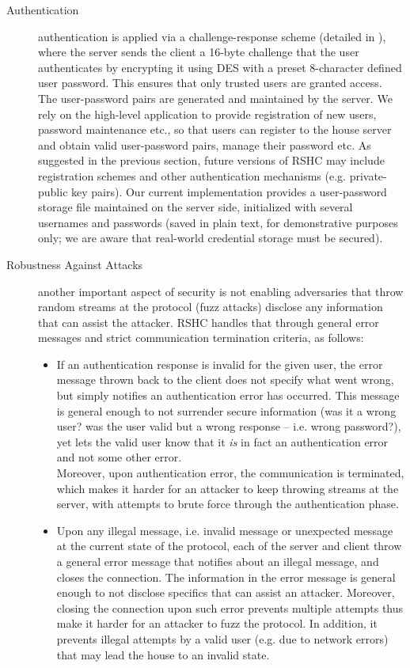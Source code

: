 \begin{description}
\item[Authentication] authentication is applied via a challenge-response scheme (detailed in ), where the server sends the client a 16-byte challenge that the user authenticates by encrypting it using DES with a preset 8-character defined user password. This ensures that only trusted users are granted access.\\
    The user-password pairs are generated and maintained by the server. We rely on the high-level application to provide registration of new users, password maintenance etc., so that users can register to the house server and obtain valid user-password pairs, manage their password etc. As suggested in the previous section, future versions of RSHC may include registration schemes and other authentication mechanisms (e.g. private-public key pairs). Our current implementation provides a user-password storage file maintained on the server side, initialized with several usernames and passwords (saved in plain text, for demonstrative purposes only; we are aware that real-world credential storage must be secured).\\
\item[Robustness Against Attacks] another important aspect of security is not enabling adversaries that throw random streams at the protocol (fuzz attacks) disclose any information that can assist the attacker. RSHC handles that through general error messages and strict communication termination criteria, as follows:
    \begin{itemize}
    \item If an authentication response is invalid for the given user, the error message thrown back to the client does not specify what went wrong, but simply notifies an authentication error has occurred. This message is general enough to not surrender secure information (was it a wrong user? was the user valid but a wrong response -- i.e. wrong password?), yet lets the valid user know that it {\em is} in fact an authentication error and not some other error.\\
        Moreover, upon authentication error, the communication is terminated, which makes it harder for an attacker to keep throwing streams at the server, with attempts to brute force through the authentication phase.
    \item Upon any illegal message, i.e. invalid message or unexpected message at the current state of the protocol, each of the server and client throw a general error message that notifies about an illegal message, and closes the connection. The information in the error message is general enough to not disclose specifics that can assist an attacker. Moreover, closing the connection upon such error prevents multiple attempts thus make it harder for an attacker to fuzz the protocol. In addition, it prevents illegal attempts by a valid user (e.g. due to network errors) that may lead the house to an invalid state.
    \end{itemize}
\end{description}

